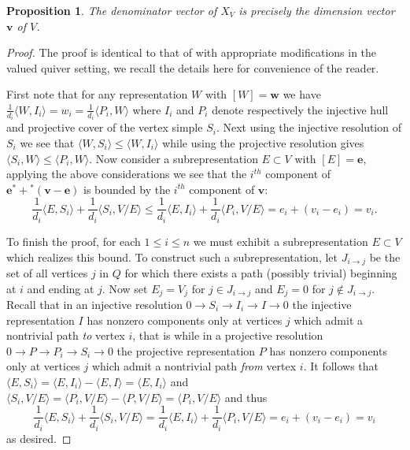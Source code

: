 \documentclass{amsart}
\newtheorem{proposition}[theorem]{Proposition}
\newcommand{\bfe}{\mathbf{e}}
\newcommand{\bfv}{\mathbf{v}}
\newcommand{\bfw}{\mathbf{w}}
\begin{document}
 \begin{proposition}
  The denominator vector of $X_V$ is precisely the dimension vector $\bfv$ of $V$.
 \end{proposition}
 \begin{proof}
  The proof is identical to that of \cite[Sec. 4, Cor. 2]{caldero-keller} with appropriate modifications in the valued quiver setting, we recall the details here for convenience of the reader.  

  First note that for any representation $W$ with $[W]=\bfw$ we have $\frac{1}{d_i}\langle W,I_i\rangle=w_i=\frac{1}{d_i}\langle P_i,W\rangle$ where $I_i$ and $P_i$ denote respectively the injective hull and projective cover of the vertex simple $S_i$.  Next using the injective resolution of $S_i$ we see that $\langle W,S_i\rangle\le\langle W,I_i\rangle$ while using the projective resolution gives $\langle S_i,W\rangle\le\langle P_i,W\rangle$.  Now consider a subrepresentation $E\subset V$ with $[E]=\bfe$, applying the above considerations we see that the $i^{th}$ component of $\bfe^*+{}^*(\bfv-\bfe)$ is bounded by the $i^{th}$ component of $\bfv$:
  \[\frac{1}{d_i}\langle E,S_i\rangle+\frac{1}{d_i}\langle S_i,V/E\rangle\le\frac{1}{d_i}\langle E,I_i\rangle+\frac{1}{d_i}\langle P_i,V/E\rangle=e_i+(v_i-e_i)=v_i.\]

  To finish the proof, for each $1\le i\le n$ we must exhibit a subrepresentation $E\subset V$ which realizes this bound.  To construct such a subrepresentation, let $J_{i\to j}$ be the set of all vertices $j$ in $Q$ for which there exists a path (possibly trivial) beginning at $i$ and ending at $j$.  Now set $E_j=V_j$ for $j\in J_{i\to j}$ and $E_j=0$ for $j\notin J_{i\to j}$.  Recall that in an injective resolution $0\longrightarrow S_i\longrightarrow I_i\longrightarrow I\longrightarrow 0$ the injective representation $I$ has nonzero components only at vertices $j$ which admit a nontrivial path \emph{to} vertex $i$, that is while in a projective resolution $0\longrightarrow P\longrightarrow P_i\longrightarrow S_i\longrightarrow 0$ the projective representation $P$ has nonzero components only at vertices $j$ which admit a nontrivial path \emph{from} vertex $i$.  It follows that $\langle E,S_i\rangle=\langle E,I_i\rangle-\langle E,I\rangle=\langle E,I_i\rangle$ and $\langle S_i,V/E\rangle=\langle P_i,V/E\rangle-\langle P,V/E\rangle=\langle P_i,V/E\rangle$ and thus 
  \[\frac{1}{d_i}\langle E,S_i\rangle+\frac{1}{d_i}\langle S_i,V/E\rangle=\frac{1}{d_i}\langle E,I_i\rangle+\frac{1}{d_i}\langle P_i,V/E\rangle=e_i+(v_i-e_i)=v_i\]
  as desired.
 \end{proof}
\end{document}
